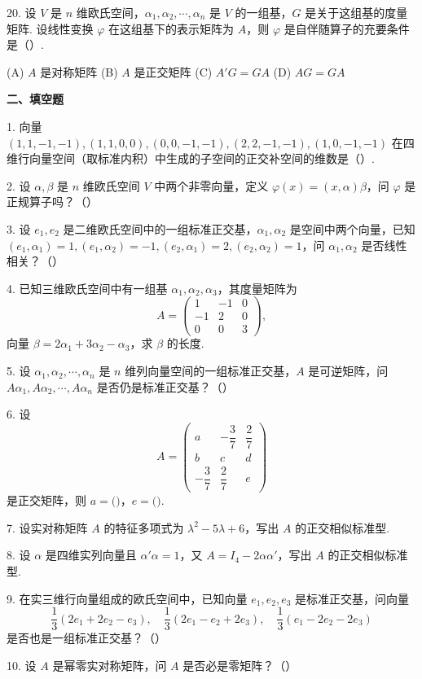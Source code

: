 \documentclass[UTF8, 12pt, fontset=fandol, oneside]{ctexart}
\begin{document}
20. 设 $V$ 是 $n$ 维欧氏空间，$\alpha_1,\alpha_2,\cdots,\alpha_n$ 是 $V$ 的一组基，$G$ 是关于这组基的度量矩阵. 设线性变换 $\varphi$ 在这组基下的表示矩阵为 $A$，则 $\varphi$ 是自伴随算子的充要条件是（\quad ）.

(A) $A$ 是对称矩阵 \qquad (B) $A$ 是正交矩阵 \qquad (C) $A'G=GA$ \qquad (D) $AG=GA$

\noindent\textbf{二、填空题}

1. 向量 $(1,1,-1,-1),(1,1,0,0),(0,0,-1,-1),(2,2,-1,-1),(1,0,-1,-1)$ 在四维行向量空间（取标准内积）中生成的子空间的正交补空间的维数是（\quad ）.

2. 设 $\alpha,\beta$ 是 $n$ 维欧氏空间 $V$ 中两个非零向量，定义 $\varphi(x)=(x,\alpha)\beta$，问 $\varphi$ 是正规算子吗？（\quad ）

3. 设 $e_1,e_2$ 是二维欧氏空间中的一组标准正交基，$\alpha_1,\alpha_2$ 是空间中两个向量，已知 $(e_1,\alpha_1)=1,(e_1,\alpha_2)=-1,(e_2,\alpha_1)=2,(e_2,\alpha_2)=1$，问 $\alpha_1,\alpha_2$ 是否线性相关？（\quad ）

4. 已知三维欧氏空间中有一组基 $\alpha_1,\alpha_2,\alpha_3$，其度量矩阵为
\[
A=\begin{pmatrix}
1&-1&0\\
-1&2&0\\
0&0&3
\end{pmatrix},
\]
向量 $\beta=2\alpha_1+3\alpha_2-\alpha_3$，求 $\beta$ 的长度.

5. 设 $\alpha_1,\alpha_2,\cdots,\alpha_n$ 是 $n$ 维列向量空间的一组标准正交基，$A$ 是可逆矩阵，问 $A\alpha_1,A\alpha_2,\cdots,A\alpha_n$ 是否仍是标准正交基？（\quad ）

6. 设
\[
A=\begin{pmatrix}
a&-\dfrac{3}{7}&\dfrac{2}{7}\\
b&c&d\\
-\dfrac{3}{7}&\dfrac{2}{7}&e
\end{pmatrix}
\]
是正交矩阵，则 $a=($\quad$)$，$e=($\quad$)$.

7. 设实对称矩阵 $A$ 的特征多项式为 $\lambda^2-5\lambda+6$，写出 $A$ 的正交相似标准型.

8. 设 $\alpha$ 是四维实列向量且 $\alpha'\alpha=1$，又 $A=I_4-2\alpha\alpha'$，写出 $A$ 的正交相似标准型.

9. 在实三维行向量组成的欧氏空间中，已知向量 $e_1,e_2,e_3$ 是标准正交基，问向量
\[
\frac{1}{3}(2e_1+2e_2-e_3),\quad \frac{1}{3}(2e_1-e_2+2e_3),\quad \frac{1}{3}(e_1-2e_2-2e_3)
\]
是否也是一组标准正交基？（\quad ）

10. 设 $A$ 是幂零实对称矩阵，问 $A$ 是否必是零矩阵？（\quad ）
\end{document}
